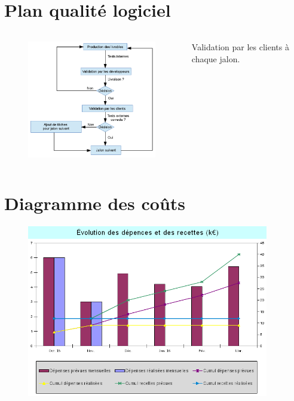 \documentclass{beamer}
\begin{document}
\section{Plan qualit\'e logiciel}
	\begin{frame}{\secname}
		\begin{columns}
			\begin{column}{8cm}
				\begin{figure}
					\includegraphics[width=8cm]{PAQL.png}
				\end{figure}
			\end{column}
			\begin{column}{4cm}
				Validation par les clients à chaque jalon.
			\end{column}
		\end{columns}
	\end{frame}




\section{Diagramme des coûts}

\begin{frame}{\secname}
	\begin{figure}
		\includegraphics[height=7.5cm]{Cout.png}
	\end{figure}
\end{frame}
\end{document}
